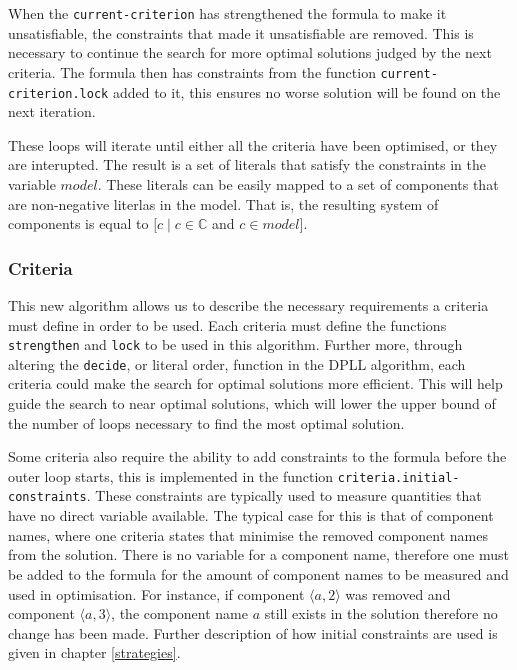 When the \verb+current-criterion+ has strengthened the formula to make it unsatisfiable, the constraints that made it unsatisfiable are removed.
This is necessary to continue the search for more optimal solutions judged by the next criteria.
The formula then has constraints from the function \verb+current-criterion.lock+ added to it, this ensures no worse solution will be found on the next iteration.

These loops will iterate until either all the criteria have been optimised, or they are interupted.
The result is a set of literals that satisfy the constraints in the variable $model$.
These literals can be easily mapped to a set of components that are non-negative literlas in the model.
That is, the resulting system of components is equal to $[c \mid c \in \mathbb{C}$ and $c \in model]$.

\subsubsection{Criteria}
This new algorithm allows us to describe the necessary requirements a criteria must define in order to be used.
Each criteria must define the functions \verb+strengthen+ and \verb+lock+ to be used in this algorithm.
Further more, through altering the \verb+decide+, or literal order, function in the DPLL algorithm, each criteria could make the search for optimal solutions more efficient.
This will help guide the search to near optimal solutions, which will lower the upper bound of the number of loops necessary to find the most optimal solution.

Some criteria also require the ability to add constraints to the formula before the outer loop starts,
this is implemented in the function \verb+criteria.initial-constraints+.
These constraints are typically used to measure quantities that have no direct variable available.
The typical case for this is that of component names, where one criteria states that minimise the removed component names from the solution.
There is no variable for a component name, therefore one must be added to the formula for the amount of component names to be measured and used in optimisation.
For instance, if component $\langle a,2\rangle$ was removed and component $\langle a,3 \rangle$, the component name $a$ still exists in the solution therefore no change has been made.
Further description of how initial constraints are used is given in chapter \ref{strategies}. 

